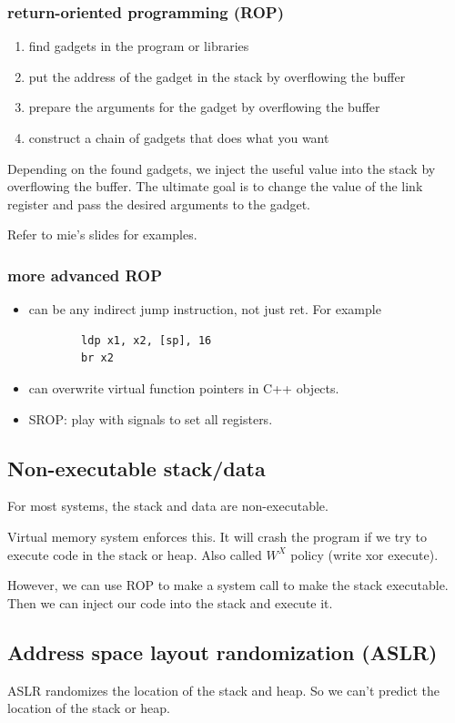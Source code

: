 \documentclass[letterpaper,12pt]{article}
\begin{document}
\subsubsection{return-oriented programming (ROP)}
\begin{enumerate}
    \item find gadgets in the program or libraries
    \item put the address of the gadget in the stack by overflowing the buffer
    \item prepare the arguments for the gadget by overflowing the buffer
    \item construct a chain of gadgets that does what you want
\end{enumerate}
Depending on the found gadgets, we inject the useful value into the stack by overflowing the buffer. The ultimate goal is to change the value of the link register and pass the desired arguments to the gadget.

Refer to mie's slides for examples.
\subsubsection{more advanced ROP}
\begin{itemize}
    \item can be any indirect jump instruction, not just ret. For example \begin{lstlisting}
        ldp x1, x2, [sp], 16
        br x2
    \end{lstlisting}
    \item can overwrite virtual function pointers in C++ objects.
    \item SROP: play with signals to set all registers.
\end{itemize}

\subsection{Non-executable stack/data}
For most systems, the stack and data are non-executable.

Virtual memory system enforces this. It will crash the program if we try to
execute code in the stack or heap. Also called $W^X$ policy (write xor
execute).

However, we can use ROP to make a system call to make the stack executable.
Then we can inject our code into the stack and execute it.

\subsection{Address space layout randomization (ASLR)}
ASLR randomizes the location of the stack and heap. So we can't predict the
location of the stack or heap.
\end{document}
